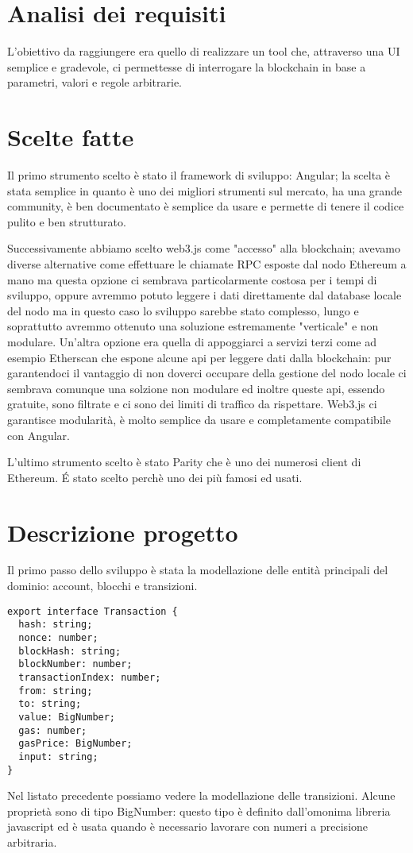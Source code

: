 \section{Analisi dei requisiti}
L'obiettivo da raggiungere era quello di realizzare un tool che, attraverso una UI semplice e gradevole, ci permettesse di interrogare la blockchain in base a parametri, valori e regole arbitrarie.

\section{Scelte fatte}

Il primo strumento scelto è stato il framework di sviluppo: Angular;
la scelta è stata semplice in quanto è uno dei migliori strumenti sul mercato, ha una grande community, è ben documentato è semplice da usare e permette di tenere il codice pulito e ben strutturato.

\vspace{0.5cm}

Successivamente abbiamo scelto web3.js come "accesso" alla blockchain; 
avevamo diverse alternative come effettuare le chiamate RPC esposte dal nodo Ethereum a mano ma questa opzione ci sembrava particolarmente costosa per i tempi di sviluppo,
oppure avremmo potuto leggere i dati direttamente dal database locale del nodo ma in questo caso lo sviluppo sarebbe stato complesso, lungo e soprattutto avremmo ottenuto una soluzione estremamente "verticale" e non modulare.
Un'altra opzione era quella di appoggiarci a servizi terzi come ad esempio Etherscan che espone alcune api per leggere dati dalla blockchain:
pur garantendoci il vantaggio di non doverci occupare della gestione del nodo locale ci sembrava comunque una solzione non modulare ed inoltre queste api, essendo gratuite, sono filtrate e ci sono dei limiti di traffico da rispettare.
Web3.js ci garantisce modularità, è molto semplice da usare e completamente compatibile con Angular.

\vspace{0.5cm}

L'ultimo strumento scelto è stato Parity che è uno dei numerosi client di Ethereum. \'E stato scelto perchè uno dei più famosi ed usati.

\section{Descrizione progetto}
Il primo passo dello sviluppo è stata la modellazione delle entità principali del dominio: account, blocchi e transizioni.
\begin{lstlisting}
export interface Transaction {
  hash: string;
  nonce: number;
  blockHash: string;
  blockNumber: number;
  transactionIndex: number;
  from: string;
  to: string;
  value: BigNumber;
  gas: number;
  gasPrice: BigNumber;
  input: string;
}
\end{lstlisting}
Nel listato precedente possiamo vedere la modellazione delle transizioni.
Alcune proprietà sono di tipo BigNumber: questo tipo è definito dall'omonima libreria javascript ed è usata quando è necessario lavorare con numeri a precisione arbitraria.

